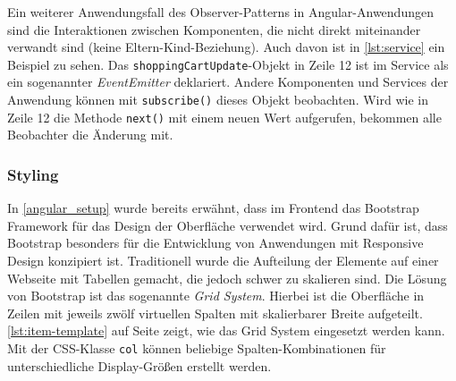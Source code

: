 Ein weiterer Anwendungsfall des Observer-Patterns in Angular-Anwendungen sind die Interaktionen zwischen Komponenten, die nicht direkt miteinander verwandt sind (keine Eltern-Kind-Beziehung). Auch davon ist in \cref{lst:service} ein Beispiel zu sehen. Das \texttt{shoppingCartUpdate}-Objekt in Zeile 12 ist im Service als ein sogenannter \textit{EventEmitter} deklariert. Andere Komponenten und Services der Anwendung können mit \texttt{subscribe()} dieses Objekt beobachten. Wird wie in Zeile 12 die Methode \texttt{next()} mit einem neuen Wert aufgerufen, bekommen alle Beobachter die Änderung mit.

\subsubsection{Styling}

In \cref{angular_setup} wurde bereits erwähnt, dass im Frontend das Bootstrap Framework für das Design der Oberfläche verwendet wird. Grund dafür ist, dass Bootstrap besonders für die Entwicklung von Anwendungen mit Responsive Design konzipiert ist. Traditionell wurde die Aufteilung der Elemente auf einer Webseite mit Tabellen gemacht, die jedoch schwer zu skalieren sind. Die Lösung von Bootstrap ist das sogenannte \textit{Grid System}. Hierbei ist die Oberfläche in Zeilen mit jeweils zwölf virtuellen Spalten mit skalierbarer Breite aufgeteilt. \cref{lst:item-template} auf Seite \pageref{lst:item-template} zeigt, wie das Grid System eingesetzt werden kann. Mit der CSS-Klasse \texttt{col} können beliebige Spalten-Kombinationen für unterschiedliche Display-Größen erstellt werden.
